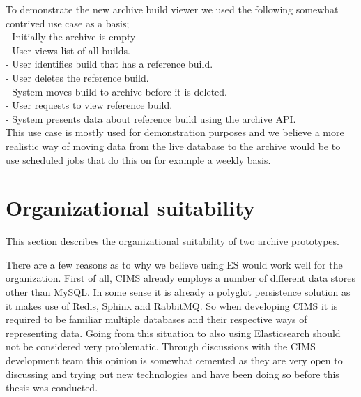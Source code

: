 To demonstrate the new archive build viewer we used the following somewhat contrived use case as a basis; \\
- Initially the archive is empty \\
- User views list of all builds. \\
- User identifies build that has a reference build. \\
- User deletes the reference build.  \\
- System moves build to archive before it is deleted.  \\
- User requests to view reference build. \\
- System presents data about reference build using the archive API. \\


This use case is mostly used for demonstration purposes and we believe a more realistic way of moving data from the live database to the archive would be to use scheduled jobs that do this on for example a weekly basis.

\section{Organizational suitability}
This section describes the organizational suitability of two archive prototypes.


There are a few reasons as to why we believe using ES would work well for the organization. First of all, CIMS already employs a number of different data stores other than MySQL. In some sense it is already a polyglot persistence solution as it makes use of Redis, Sphinx and RabbitMQ. So when developing CIMS it is required to be familiar multiple databases and their respective ways of representing data. Going from this situation to also using Elasticsearch should not be considered very problematic. Through discussions with the CIMS development team this opinion is somewhat cemented as they are very open to discussing and trying out new technologies and have been doing so before this thesis was conducted. 

